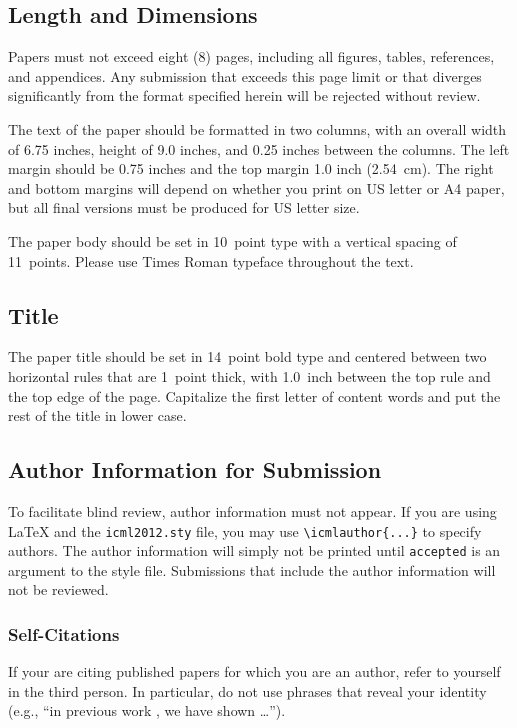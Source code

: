 \documentclass{article}
\begin{document}
\subsection{Length and Dimensions}

Papers must not exceed eight (8) pages, including all figures, tables,
references, and appendices. Any submission that exceeds this page
limit or that diverges significantly from the format specified herein
will be rejected without review.

The text of the paper should be formatted in two columns, with an
overall width of 6.75 inches, height of 9.0 inches, and 0.25 inches
between the columns. The left margin should be 0.75 inches and the top
margin 1.0 inch (2.54~cm). The right and bottom margins will depend on
whether you print on US letter or A4 paper, but all final versions
must be produced for US letter size.

The paper body should be set in 10~point type with a vertical spacing
of 11~points. Please use Times Roman typeface throughout the text.

\subsection{Title}

The paper title should be set in 14~point bold type and centered
between two horizontal rules that are 1~point thick, with 1.0~inch
between the top rule and the top edge of the page. Capitalize the
first letter of content words and put the rest of the title in lower
case.

\subsection{Author Information for Submission}
\label{author info}

To facilitate blind review, author information must not appear.  If
you are using \LaTeX\/ and the \texttt{icml2012.sty} file, you may use
\verb+\icmlauthor{...}+ to specify authors.  The author information
will simply not be printed until {\tt accepted} is an argument to the
style file. Submissions that include the author information will not
be reviewed.

\subsubsection{Self-Citations}

If your are citing published papers for which you are an author, refer
to yourself in the third person. In particular, do not use phrases
that reveal your identity (e.g., ``in previous work \cite{langley00}, we
have shown \ldots'').
\end{document}
